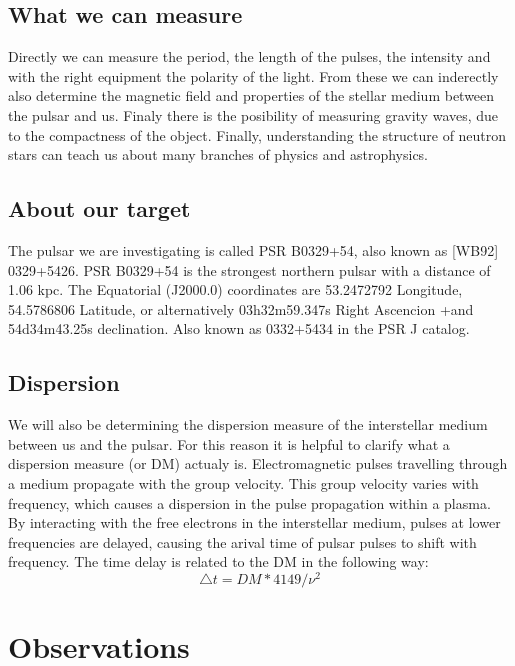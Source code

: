 \documentclass[twoside,twocolumn]{article}
\begin{document}
	\subsection{What we can measure}
	Directly we can measure the period, the length of the pulses, the intensity and with the right equipment the polarity of the light. From these we can inderectly also determine the magnetic field and properties of the stellar medium between the pulsar and us. Finaly there is the posibility of measuring gravity waves, due to the compactness of the object. Finally, understanding the structure of neutron stars can teach us about many branches of physics and astrophysics.
	\subsection{About our target}
	The pulsar we are investigating is called PSR B0329+54, also known as [WB92] 0329+5426. 
	PSR B0329+54 is the strongest northern pulsar with a distance of 1.06 kpc.\cite{Wang} The Equatorial (J2000.0) coordinates are 53.2472792 Longitude, 54.5786806 Latitude, or alternatively 03h32m59.347s Right Ascencion +and 54d34m43.25s declination. Also known as 0332+5434 in the PSR J catalog.
	\cite{NAD}
	
	\subsection{Dispersion}
	We will also be determining the dispersion measure of the interstellar medium between us and the pulsar. For this reason it is helpful to clarify what a dispersion measure (or DM) actualy is.	Electromagnetic	pulses travelling through a medium propagate with the group velocity. This group velocity varies with frequency, which causes a dispersion in the pulse propagation within a plasma. By interacting with the free electrons in the interstellar medium,	pulses	at	lower frequencies are delayed, causing the arival time of pulsar pulses to shift with frequency. The time delay is related to the DM in the following way: 
	\begin{equation}
	\triangle t=DM*4149/{\nu}^{ 2 }
	\end{equation}
	
	
	
	\section{Observations}
	
\end{document}
